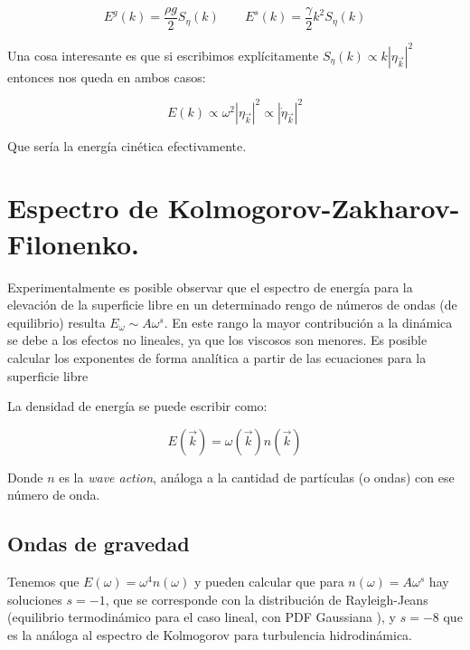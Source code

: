 \begin{equation}
		E^g(k) = \frac{\rho g}{2} S_\eta(k) \qquad E^s(k)=\frac{\gamma}{2}k^2S_\eta(k)
\end{equation}


Una cosa interesante es que si escribimos explícitamente $S_\eta(k) \propto k|\eta_{\vec k}|^2$ entonces nos queda en ambos casos:

\begin{equation}
	E(k) \propto \omega^2|\eta_{\vec k}|^2 \propto |\dot \eta_{\vec k}|^2 
\end{equation}

Que sería la energía cinética efectivamente.










\section{Espectro de Kolmogorov-Zakharov-Filonenko.}
Experimentalmente es posible observar que el espectro de energía para la elevación de la superficie libre en un determinado rengo de números de ondas (de equilibrio) resulta $E_\omega  \sim A\omega^s$. En este rango la mayor contribución a la dinámica se debe a los efectos no lineales, ya que los viscosos son menores. Es posible calcular los exponentes de forma analítica a partir de las ecuaciones para la superficie libre \cite{zakharovEnergySpectrumStochastic1967}

La densidad de energía se puede escribir como:

\begin{equation}
	E(\vec k) = \omega(\vec k) n(\vec k)
\end{equation}  

Donde $n$ es la \textit{wave action}, análoga a la cantidad de partículas (o ondas) con ese número de onda.

\subsection*{Ondas de gravedad \cite{zakharovEnergySpectrumStochastic1967}}
Tenemos que $E(\omega)=\omega^4n(\omega)$ y pueden calcular que para $n(\omega)=A\omega^s$ hay soluciones $s=-1$, que se corresponde con la distribución de Rayleigh-Jeans (equilibrio termodinámico para el caso lineal, con PDF Gaussiana \cite{nazarenkoWaveTurbulence2011}), y $s=-8$ que es la análoga al espectro de Kolmogorov para turbulencia hidrodinámica.


